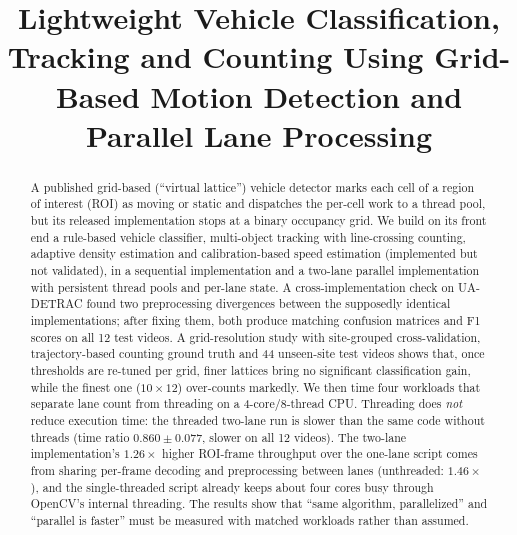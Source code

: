 \documentclass[conference]{IEEEtran}
\begin{document}
\title{Lightweight Vehicle Classification, Tracking and Counting
Using Grid-Based Motion Detection and Parallel Lane Processing}

\author{
\and
{}
}

\maketitle

\begin{abstract}
A published grid-based (``virtual lattice'') vehicle detector marks each
cell of a region of interest (ROI) as moving or static and dispatches
the per-cell work to a thread pool, but its released implementation stops
at a binary occupancy grid. We build on its front end a rule-based
vehicle classifier, multi-object tracking with line-crossing counting,
adaptive density estimation and calibration-based speed estimation (implemented
but not validated), in a sequential implementation and a two-lane parallel
implementation with persistent thread pools and per-lane state. A cross-implementation check
on UA-DETRAC found two preprocessing divergences between the supposedly
identical implementations; after fixing them, both produce matching confusion
matrices and F1 scores on all 12 test videos. A grid-resolution study with
site-grouped cross-validation, trajectory-based counting ground truth and
44 unseen-site test videos shows that, once thresholds are re-tuned per
grid, finer lattices bring no significant classification gain, while the
finest one ($10{\times}12$) over-counts markedly. We then time four
workloads that separate lane count from threading on a 4-core/8-thread
CPU. Threading does \emph{not} reduce execution time: the threaded
two-lane run is slower than the same code without threads (time ratio
$0.860\pm0.077$, slower on all 12 videos). The two-lane implementation's
$1.26\times$ higher ROI-frame throughput over the one-lane script comes
from sharing per-frame decoding and preprocessing between lanes
(unthreaded: $1.46\times$), and the single-threaded script already keeps
about four cores busy through OpenCV's internal threading. The results
show that ``same algorithm, parallelized'' and ``parallel is faster''
must be measured with matched workloads rather than assumed.
\end{abstract}
\end{document}
